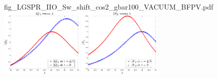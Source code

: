 \documentclass[11pt]{article}
\begin{document}
\begin{figure}[H]
{		{fig_LGSPR_IIO_Sw_shift_cos2_gbar100_VACUUM_BFPV.pdf}}
	\\
	\subfigure 
	{\includegraphics[width=0.35\textwidth]
		{fig_LGSPR_IIO_Qu_shift_cos2_gbar1000_VACUUM_BFPV.pdf}}
	\quad
	\subfigure 
	{\includegraphics[width=0.35\textwidth]
		{fig_LGSPR_IIO_Sw_shift_cos2_gbar1000_VACUUM_BFPV.pdf}}
\end{figure}
\end{document}
